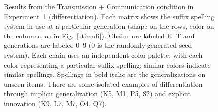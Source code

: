 \documentclass[doc,biblatex]{apa7}
\begin{document}
	\begin{figure}
	\vspace*{2pt}
	\caption{Results from the Transmission + Communication condition in Experiment~1 (differentiation). Each matrix shows the suffix spelling system in use at a particular generation (shape on the rows, color on the columns, as in Fig.~\ref{stimuli}). Chains are labeled K--T and generations are labeled 0–9 (0 is the randomly generated seed system). Each chain uses an independent color palette, with each color representing a particular suffix spelling; similar colors indicate similar spellings. Spellings in bold-italic are the generalizations on unseen items. There are some isolated examples of differentiation through implicit generalization (K5, M1, P5, S2) and explicit innovation (K9, L7, M7, O4, Q7).}
	\label{dif_com}
	\end{figure}
\end{document}

